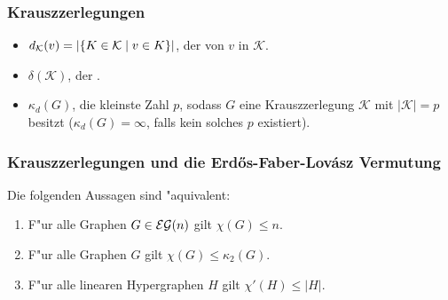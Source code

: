 \documentclass{beamer}
\begin{document}
\begin{frame}[<+->]
  \frametitle{Krauszzerlegungen}
  \begin{itemize}[<+->]
    \item $d_{\mathcal{K}}(v) = | \{K\in \mathcal{K} \;|\; v\in K \}| $, der  von $v$ in $\mathcal{K}$.
    \item $\delta(\mathcal{K})$, der  .
    \item $\kappa_{d}(G)$, die kleinste Zahl $p$, sodass $G$ eine Krauszzerlegung $\mathcal{K}$ mit $|\mathcal{K}| = p$ besitzt ($\kappa_{d}(G) = \infty$, falls kein solches $p$ existiert).
  \end{itemize}
\end{frame}

\begin{frame}[<+->]
  \frametitle{Krauszzerlegungen und die Erd\H os-Faber-Lov\'asz Vermutung}
  \begin{theorem}
    Die folgenden Aussagen sind "aquivalent:
    \begin{enumerate}[<+->]
      \item F"ur alle Graphen $G\in {\cal EG}(n)$ gilt $\chi(G) \leq n$.
      \item F"ur alle Graphen $G$ gilt $\chi(G) \leq \kappa_{2}(G)$.
      \item F"ur alle linearen Hypergraphen $H$ gilt $\chi'(H) \leq |H|$.
    \end{enumerate}
  \end{theorem}
\end{frame}
\end{document}
